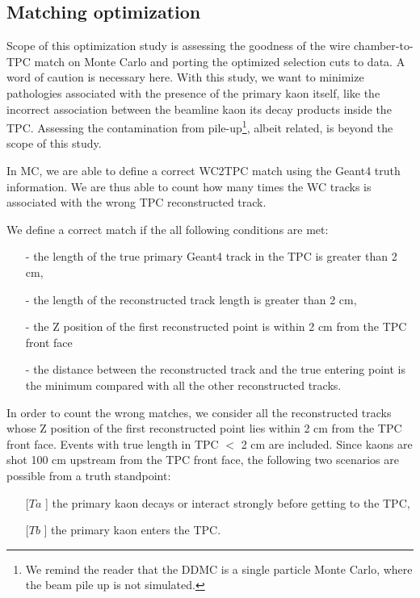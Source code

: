 

\subsection{Matching optimization}
Scope of this optimization study is assessing the goodness of the wire chamber-to-TPC match on Monte Carlo and porting the optimized selection cuts to data. A word of caution is necessary here. With this study, we want to minimize pathologies associated with the presence of the primary kaon itself, like the incorrect association between the beamline kaon its decay products inside the TPC.  Assessing the contamination from pile-up\footnote{We remind the reader that the DDMC is a single particle Monte Carlo, where the beam pile up is not simulated.}, albeit related, is beyond the scope of this study.

In MC, we are able to define a correct WC2TPC match using the Geant4 truth information. We are thus able to count how many times the WC tracks is associated with the wrong TPC reconstructed track. 

We define a correct match if the all following conditions are met:
\begin{itemize}
\item[-] the length of the true primary Geant4 track in the TPC is greater than 2 cm,  
\item[-] the length of the reconstructed track length is greater than 2 cm,
\item[-] the Z position of the first reconstructed point is within 2 cm from the TPC front face
\item[-] the distance between the reconstructed track and the true entering point is the minimum compared with all the other reconstructed tracks.
\end{itemize}

In order to count the wrong matches, we consider all the reconstructed tracks whose Z position of the first reconstructed point lies within 2 cm from the TPC front face. Events with true length in TPC $<$ 2 cm are included. 
Since kaons are shot 100 cm upstream from the TPC front face, the following two scenarios are possible from a truth standpoint: 
\begin{itemize}
\item[[$Ta$]] the primary kaon decays or interact strongly before getting to the TPC,
\item[[$Tb$]] the primary kaon enters the TPC.
\end{itemize}

